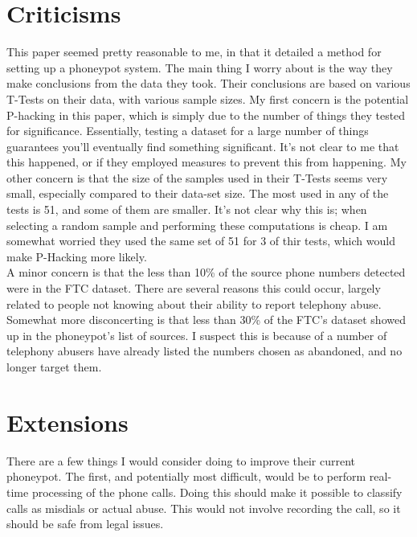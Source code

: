 \documentclass{article}
\begin{document}
\section{Criticisms}
This paper seemed pretty reasonable to me,
in that it detailed a method for setting up a phoneypot system.
The main thing I worry about is the way they make conclusions from the data they took.
Their conclusions are based on various T-Tests on their data, with various sample sizes.
My first concern is the potential P-hacking in this paper,
which is simply due to the number of things they tested for significance.
Essentially, testing a dataset for a large number of things guarantees you'll eventually find something significant.
It's not clear to me that this happened, or if they employed measures to prevent this from happening.
My other concern is that the size of the samples used in their T-Tests seems very small,
especially compared to their data-set size.
The most used in any of the tests is 51, and some of them are smaller.
It's not clear why this is; when selecting a random sample and performing these computations is cheap.
I am somewhat worried they used the same set of 51 for 3 of thir tests,
which would make P-Hacking more likely.\\
A minor concern is that the less than 10\% of the source phone numbers detected were in the FTC dataset.
There are several reasons this could occur,
largely related to people not knowing about their ability to report telephony abuse.
Somewhat more disconcerting is that less than 30\% of the FTC's dataset showed up in the phoneypot's list of sources.
I suspect this is because of a number of telephony abusers have already listed the numbers chosen as abandoned, and no longer target them.
\section{Extensions}
There are a few things I would consider doing to improve their current phoneypot.
The first, and potentially most difficult, would be to perform real-time processing of the phone calls.
Doing this should make it possible to classify calls as misdials or actual abuse.
This would not involve recording the call, so it should be safe from legal issues.
\end{document}
